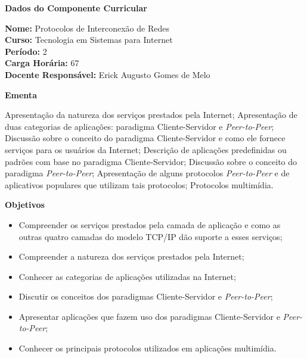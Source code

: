 

\begin{snugshade}\begin{center}\textbf{
	Dados do Componente Curricular
}\end{center}\end{snugshade}

\noindent 	\textbf{Nome:} Protocolos de Interconexão de Redes
\\ 			\textbf{Curso:} Tecnologia em Sistemas para Internet
\\ 			\textbf{Período:} \unit{2}{\degree}
\\ 			\textbf{Carga Horária:} \unit{67}{\hour}
\\ 			\textbf{Docente Responsável:} Erick Augusto Gomes de Melo


\begin{snugshade}\begin{center}\textbf{
    Ementa
\vphantom{q}}\end{center}\end{snugshade}

\noindent
Apresentação da natureza dos serviços prestados pela Internet; Apresentação de duas categorias de aplicações: paradigma Cliente-Servidor e \textit{Peer-to-Peer}; Discussão sobre o conceito do paradigma Cliente-Servidor e como ele fornece serviços para os usuários da Internet; Descrição de aplicações predefinidas ou padrões com base no paradigma Cliente-Servidor; Discussão sobre o conceito do paradigma \textit{Peer-to-Peer}; Apresentação de alguns protocolos \textit{Peer-to-Peer} e de aplicativos populares que utilizam tais protocolos; Protocolos multimídia.

\begin{snugshade}\begin{center}\textbf{
    Objetivos
}\end{center}\end{snugshade}


\begin{itemize}

\item Compreender os serviços prestados pela camada de aplicação e como as outras quatro camadas do modelo TCP/IP dão suporte a esses serviços;
\item Compreender a natureza dos serviços prestados pela Internet;
\item Conhecer as categorias de aplicações utilizadas na Internet;
\item Discutir os conceitos dos paradigmas Cliente-Servidor e \textit{Peer-to-Peer};
\item Apresentar aplicações que fazem uso dos paradigmas Cliente-Servidor e \textit{Peer-to-Peer};
\item Conhecer os principais protocolos utilizados em aplicações multimídia.

\end{itemize} 

